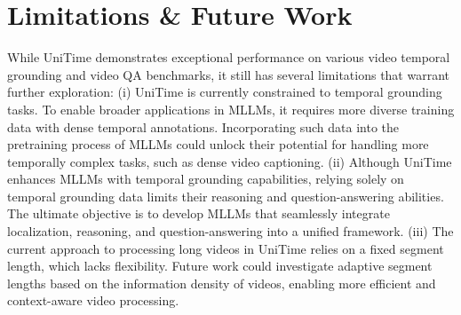 
\section{Limitations \& Future Work}
\label{sec:limitations}

While UniTime demonstrates exceptional performance on various video temporal grounding and video QA benchmarks, it still has several limitations that warrant further exploration:
(i) UniTime is currently constrained to temporal grounding tasks. To enable broader applications in MLLMs, it requires more diverse training data with dense temporal annotations. Incorporating such data into the pretraining process of MLLMs could unlock their potential for handling more temporally complex tasks, such as dense video captioning.
(ii) Although UniTime enhances MLLMs with temporal grounding capabilities, relying solely on temporal grounding data limits their reasoning and question-answering abilities. The ultimate objective is to develop MLLMs that seamlessly integrate localization, reasoning, and question-answering into a unified framework.
(iii) The current approach to processing long videos in UniTime relies on a fixed segment length, which lacks flexibility. Future work could investigate adaptive segment lengths based on the information density of videos, enabling more efficient and context-aware video processing.

